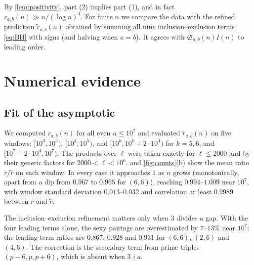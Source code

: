 \documentclass[11pt]{amsart}
\theoremstyle{definition}
\theoremstyle{remark}
\newcommand{\Sg}{\mathfrak{S}}
\begin{document}
By \cref{lem:positivity}, part (2) implies part (1), and in fact $r_{a,b}(n)\gg n/(\log n)^4$. For finite $n$ we compare the data with the refined prediction $\widetilde r_{a,b}(n)$ obtained by summing all nine inclusion--exclusion terms \eqref{eq:BH} with signs (and halving when $a=b$). It agrees with $\Sg_{a,b}(n)I(n)$ to leading order.

\section{Numerical evidence}\label{sec:evidence}

\subsection{Fit of the asymptotic}
We computed $r_{a,b}(n)$ for all even $n\le 10^7$ and evaluated $\widetilde r_{a,b}(n)$ on five windows: $[10^3,10^4)$, $[10^4,10^5)$, and $[10^k,10^k+2\cdot10^4)$ for $k=5,6$, and $[10^7-2\cdot10^4,10^7)$. The products over $\ell$ were taken exactly for $\ell\le2000$ and by their generic factors for $2000<\ell<10^6$.  and \cref{fig:counts}(b) show the mean ratio $r/\widetilde r$ on each window. In every case it approaches $1$ as $n$ grows (monotonically, apart from a dip from $0.967$ to $0.965$ for $(6,6)$), reaching $0.994$--$1.009$ near $10^7$, with window standard deviation $0.013$--$0.032$ and correlation at least $0.9989$ between $r$ and $\widetilde r$.

The inclusion--exclusion refinement matters only when $3$ divides a gap. With the four leading terms alone, the sexy pairings are overestimated by $7$--$13\%$ near $10^7$: the leading-term ratios are $0.867$, $0.928$ and $0.931$ for $(6,6)$, $(2,6)$ and $(4,6)$. The correction is the secondary term from prime triples $(p-6,p,p+6)$, which is absent when $3\nmid a$.
\end{document}
